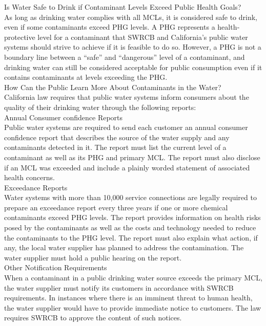 \documentclass{article}
\begin{document}
Is Water Safe to Drink if Contaminant Levels Exceed Public Health Goals?\\
 As long as drinking water complies with all MCLs, it is considered safe to drink, even if some contaminants exceed PHG levels. A PHG represents a health‐protective level for a contaminant that SWRCB and California’s public water systems should strive to achieve if it is feasible to do so. However, a PHG is not a boundary line between a “safe” and “dangerous” level of a contaminant, and drinking water can still be considered acceptable for public consumption even if it contains contaminants at levels exceeding the PHG.\\
How Can the Public Learn More About Contaminants in the Water? \\
California law requires that public water systems inform consumers about the quality of their drinking water through the following reports:\\
Annual Consumer confidence Reports\\
 Public water systems are required to send each customer an annual consumer confidence report that describes the source of the water supply and any contaminants detected in it. The report must list the current level of a contaminant as well as its PHG and primary MCL. The report must also disclose if an MCL was exceeded and include a plainly worded statement of associated health concerns.\\

Exceedance Reports\\
 Water systems with more than 10,000 service connections are legally required to prepare an exceedance report every three years if one or more chemical contaminants exceed PHG levels. The report provides information on health risks posed by the contaminants as well as the costs and technology needed to reduce the contaminants to the PHG level. The report must also explain what action, if any, the local water supplier has planned to address the contamination. The water supplier must hold a public hearing on the report.\\
Other Notification Requirements\\
When a contaminant in a public drinking water source exceeds the primary MCL, the water supplier must notify its customers in accordance with SWRCB requirements. In instances where there is an imminent threat to human health, the water supplier would have to provide immediate notice to customers. The law requires SWRCB to approve the content of such notices.\\
\end{document}
